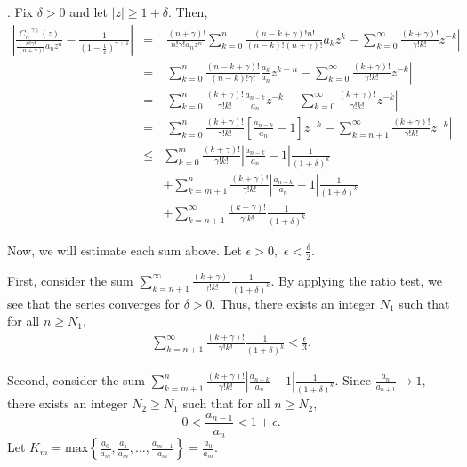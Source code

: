 \documentclass[final]{siamltex}
\begin{document}
. Fix $\delta > 0$ and let $|z| \geq 1 + \delta.$ Then, 
 \begin{eqnarray} \left| \frac{ C_{n}^{(\gamma)}(z)}{ \frac{n! \gamma !}{(n+ \gamma)!} a_{n}z^{n} } - \frac{1}{(1 - \frac{1}{z})^{ \gamma + 1}} \right|  & = & \left| \frac{ (n+ \gamma)!}{n! \gamma ! a_{n} z^{n} } \sum_{k=0}^{n} \frac{ (n-k+ \gamma)!n!}{ (n-k)!(n+ \gamma)!} a_{k} z^{k} - \sum_{k=0}^{\infty} \frac{ (k + \gamma)!}{ \gamma! k!} z^{-k} \right| \nonumber \\
  & = &  \left| \sum_{k=0}^{n} \frac{ (n-k+ \gamma)!}{ (n-k)!\gamma!} \frac{a_{k}}{a_{n}} z^{k-n} - \sum_{k=0}^{\infty} \frac{ (k + \gamma)!}{ \gamma! k!} z^{-k} \right| \nonumber \\
  & = &  \left| \sum_{k=0}^{n} \frac{ (k+ \gamma)!}{ \gamma! k!}  \frac{  a_{n-k}}{a_{n}}  z^{-k} - \sum_{k=0}^{\infty} \frac{ (k + \gamma)!}{ \gamma! k!} z^{-k} \right| \nonumber \\
  & = & \left| \sum_{k=0}^{n} \frac{ (k+ \gamma)!}{ \gamma! k!} \left[ \frac{a_{n-k}}{a_{n}} - 1 \right] z^{-k} - \sum_{k=n+1}^{\infty} \frac{ (k + \gamma)!}{ \gamma! k!} z^{-k} \right| \nonumber \\
\label{l2.1}
  & \leq & \sum_{k=0}^{m} \frac{ (k+ \gamma)!}{ \gamma! k!} \left| \frac{a_{n-k}}{a_{n}} - 1 \right| \frac{1}{(1+\delta)^{k}} \nonumber \\ & &  + \sum_{k=m+1}^{n} \frac{(k+\gamma)!}{\gamma!k!} \left| \frac{a_{n-k}}{a_{n}} - 1 \right| \frac{1}{(1+\delta)^{k}} \nonumber \\ & &  + \sum_{k=n+1}^{\infty} \frac{(k+\gamma)!}{\gamma!k!}\frac{1}{(1+\delta)^{k}} 
  \end{eqnarray} 

  Now, we will estimate each sum above. 
  Let $\epsilon > 0,$ $ \epsilon < \frac{\delta}{2}.$ 

First, consider the sum 
 $ \sum_{k=n+1}^{\infty} \frac{(k+ \gamma)!}{\gamma! k!} \frac{1}{(1+\delta)^{k}}.$ By applying the ratio test, we see that the series converges for $\delta > 0.$ Thus, there exists an integer $N_{1}$ such that for all $n \geq N_{1},$ 
 \begin{eqnarray*} \sum_{k=n+1}^{\infty} \frac{(k+ \gamma)!}{\gamma! k!} \frac{1}{(1+\delta)^{k}} < \frac{\epsilon}{3}. 
 \end{eqnarray*}

Second, consider the sum $\sum_{k=m+1}^{n} \frac{(k+\gamma)!}{\gamma!k!} \left| \frac{a_{n-k}}{a_{n}} - 1 \right| \frac{1}{(1+ \delta)^{k}}.$
  Since $\frac{a_{n}}{a_{n+1}} \rightarrow 1,$ there exists an integer $N_{2} \geq N_{1}$ such that for all $n \geq N_{2},$ 
 \begin{equation} 
\label{l2.2}
0 < \frac{a_{n-1}}{a_{n}} < 1 + \epsilon. 
 \end{equation} 
 Let $K_{m} = \mbox{max} \left\{ \frac{a_{0}}{a_{m}}, \frac{a_{1}}{a_{m}}, \ldots , \frac{a_{m-1}}{a_{m}} \right\} = \frac{a_{0}}{a_{m}}.$ \newline
 
\end{document}
